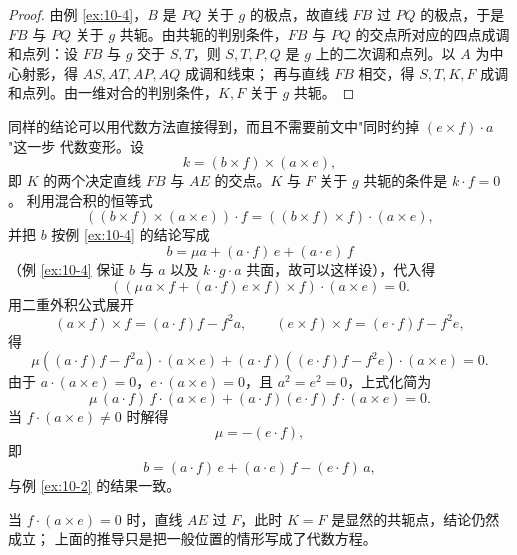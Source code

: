 \begin{proof}
由例 \ref{ex:10-4}，$B$ 是 $PQ$ 关于 $g$ 的极点，故直线 $FB$ 过 $PQ$ 的极点，于是 $FB$ 与 $PQ$
关于 $g$ 共轭。由共轭的判别条件，$FB$ 与 $PQ$ 的交点所对应的四点成调和点列：设 $FB$ 与 $g$ 交于
$S,T$，则 $S,T,P,Q$ 是 $g$ 上的二次调和点列。以 $A$ 为中心射影，得 $AS,AT,AP,AQ$ 成调和线束；
再与直线 $FB$ 相交，得 $S,T,K,F$ 成调和点列。由一维对合的判别条件，$K,F$ 关于 $g$ 共轭。
\end{proof}

同样的结论可以用代数方法直接得到，而且不需要前文中"同时约掉 $(e\times f)\cdot a$"这一步
代数变形。设
\[
k=(b\times f)\times(a\times e),
\]
即 $K$ 的两个决定直线 $FB$ 与 $AE$ 的交点。$K$ 与 $F$ 关于 $g$ 共轭的条件是 $k\cdot f=0$。
利用混合积的恒等式
\[
\left((b\times f)\times(a\times e)\right)\cdot f
=\left((b\times f)\times f\right)\cdot(a\times e),
\]
并把 $b$ 按例 \ref{ex:10-4} 的结论写成
\[
b=\mu a+(a\cdot f)\,e+(a\cdot e)\,f
\]
（例 \ref{ex:10-4} 保证 $b$ 与 $a$ 以及 $k\cdot g\cdot a$ 共面，故可以这样设），代入得
\[
\left(\left(\mu\,a\times f+(a\cdot f)\,e\times f\right)\times f\right)\cdot(a\times e)=0 .
\]
用二重外积公式展开
\[
(a\times f)\times f=(a\cdot f)f-f^2a,\qquad
(e\times f)\times f=(e\cdot f)f-f^2e,
\]
得
\[
\mu\left((a\cdot f)f-f^2a\right)\cdot(a\times e)
+(a\cdot f)\left((e\cdot f)f-f^2e\right)\cdot(a\times e)=0 .
\]
由于 $a\cdot(a\times e)=0$，$e\cdot(a\times e)=0$，且 $a^2=e^2=0$，上式化简为
\[
\mu\,(a\cdot f)\,f\cdot(a\times e)+(a\cdot f)(e\cdot f)\,f\cdot(a\times e)=0 .
\]
当 $f\cdot(a\times e)\neq0$ 时解得
\[
\mu=-(e\cdot f),
\]
即
\[
b=(a\cdot f)\,e+(a\cdot e)\,f-(e\cdot f)\,a ,
\]
与例 \ref{ex:10-2} 的结果一致。

\begin{remark}
当 $f\cdot(a\times e)=0$ 时，直线 $AE$ 过 $F$，此时 $K=F$ 是显然的共轭点，结论仍然成立；
上面的推导只是把一般位置的情形写成了代数方程。
\end{remark}
